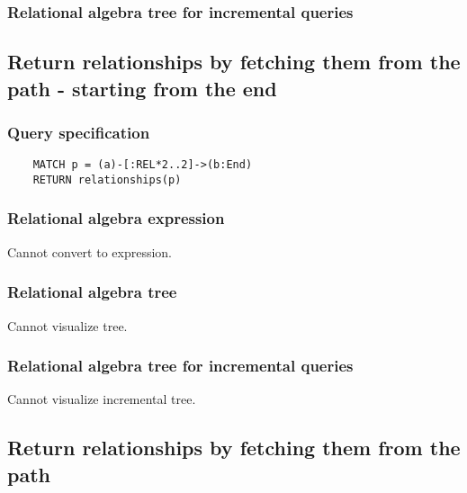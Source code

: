 	\subsubsection*{Relational algebra tree for incremental queries}

	\subsection{Return relationships by fetching them from the path - starting from the end}

	\subsubsection*{Query specification}

	\begin{lstlisting}
	MATCH p = (a)-[:REL*2..2]->(b:End)
	RETURN relationships(p)
	\end{lstlisting}


	\subsubsection*{Relational algebra expression}

	Cannot convert to expression.

	\subsubsection*{Relational algebra tree}

	Cannot visualize tree.

	\subsubsection*{Relational algebra tree for incremental queries}

	Cannot visualize incremental tree.
	\subsection{Return relationships by fetching them from the path}

